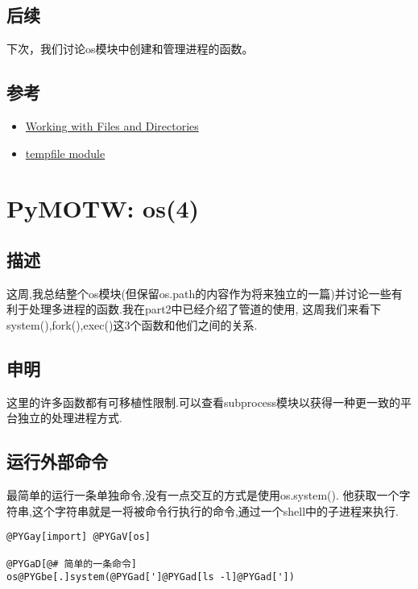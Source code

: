 \documentclass[a4paper,10pt,english]{manual}
\begin{document}
\subsection{后续}

下次，我们讨论os模块中创建和管理进程的函数。


\subsection{参考}
\begin{itemize}
\item {} 
\href{http://docs.python.org/lib/os-file-dir.html}{Working with Files and Directories}

\item {} 
\href{http://docs.python.org/lib/module-tempfile.html}{tempfile module}

\end{itemize}

\resetcurrentobjects


\section{PyMOTW: os(4)}


\subsection{描述}

这周,我总结整个os模块(但保留os.path的内容作为将来独立的一篇)并讨论一些有利于处理多进程的函数.我在part2中已经介绍了管道的使用, 这周我们来看下system(),fork(),exec()这3个函数和他们之间的关系.


\subsection{申明}

这里的许多函数都有可移植性限制.可以查看subprocess模块以获得一种更一致的平台独立的处理进程方式.


\subsection{运行外部命令}

最简单的运行一条单独命令,没有一点交互的方式是使用os.system(). 他获取一个字符串,这个字符串就是一将被命令行执行的命令,通过一个shell中的子进程来执行.

\begin{Verbatim}[commandchars=@\[\]]
@PYGay[import] @PYGaV[os]

@PYGaD[@# 简单的一条命令]
os@PYGbe[.]system(@PYGad[']@PYGad[ls -l]@PYGad['])
\end{Verbatim}
\end{document}
